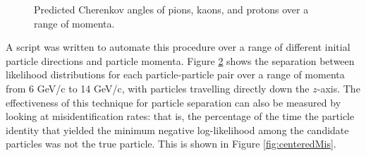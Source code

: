\begin{figure}[]
\centering
{}
\caption[Predicted Cherenkov angles of pions, kaons, and protons over a range of momenta.]{Predicted Cherenkov angles of pions, kaons, and protons over a range of momenta.}
\label{fig:changles}
\end{figure}


A script was written to automate this procedure over a range of different initial particle directions and particle momenta. 
Figure \ref{fig:centeredSeps} shows the separation between likelihood distributions for each particle-particle pair over a range of momenta from 6 GeV/c to 14 GeV/c, with particles travelling directly down the $z$-axis.
The effectiveness of this technique for particle separation can also be measured by looking at misidentification rates: that is, the percentage of the time the particle identity that yielded the minimum negative log-likelihood among the candidate particles was not the true particle.
This is shown in Figure \ref{fig:centeredMis}.

\begin{figure}[]
\centering
{}
\caption[\TODO{}]{}
\label{fig:centeredSeps} 
\end{figure}

